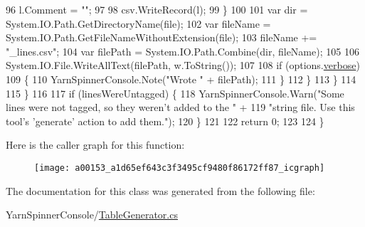 \begin{DoxyCode}
96                             l.Comment = \textcolor{stringliteral}{""};
97 
98                             csv.WriteRecord(l);
99                         \}
100 
101                         var dir = System.IO.Path.GetDirectoryName(file);
102                         var fileName = System.IO.Path.GetFileNameWithoutExtension(file);
103                         fileName += \textcolor{stringliteral}{"\_lines.csv"};
104                         var filePath = System.IO.Path.Combine(dir, fileName);
105 
106                         System.IO.File.WriteAllText(filePath, w.ToString());
107 
108                         \textcolor{keywordflow}{if} (options.\hyperlink{a00042_ada4d83d1756918f362d55f6649b82b17}{verbose})
109                         \{
110                             YarnSpinnerConsole.Note(\textcolor{stringliteral}{"Wrote "} + filePath);
111                         \}
112                     \}
113                 \}
114 
115             \}
116 
117             \textcolor{keywordflow}{if} (linesWereUntagged) \{
118                 YarnSpinnerConsole.Warn(\textcolor{stringliteral}{"Some lines were not tagged, so they weren't added to the "} +
119                                \textcolor{stringliteral}{"string file. Use this tool's 'generate' action to add them."});
120             \}
121 
122             \textcolor{keywordflow}{return} 0;
123 
124         \}
\end{DoxyCode}


Here is the caller graph for this function\-:
\nopagebreak
\begin{figure}[H]
\begin{center}
\leavevmode
\texttt{[image: a00153\_a1d65ef643c3f3495cf9480f86172ff87\_icgraph]}
\end{center}
\end{figure}




The documentation for this class was generated from the following file\-:\begin{DoxyCompactItemize}
\item 
Yarn\-Spinner\-Console/\hyperlink{a00304}{Table\-Generator.\-cs}\end{DoxyCompactItemize}
